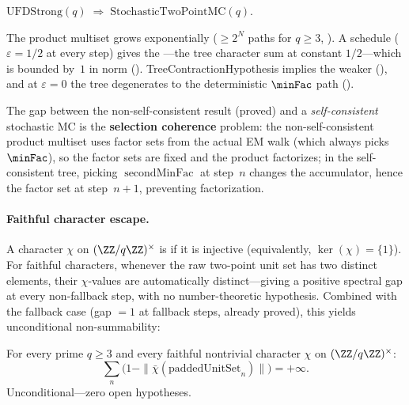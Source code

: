 \begin{theorem}
\label{thm:stochastic-two-point}
$\mathrm{UFDStrong}(q) \;\Longrightarrow\; \mathrm{StochasticTwoPointMC}(q)$.
\end{theorem}

\noindent The product multiset grows exponentially
($\geq 2^N$ paths for $q \geq 3$,
).
A  schedule ($\varepsilon = 1/2$ at every step) gives
the ---the tree character sum at constant
$1/2$---which is bounded by~$1$ in norm
().
TreeContractionHypothesis implies the weaker
(),
and at $\varepsilon = 0$ the tree degenerates to the deterministic
$\minFac$ path
().

The gap between the non-self-consistent result (proved) and a
\emph{self-consistent} stochastic MC is the \textbf{selection coherence}
problem: the non-self-consistent product multiset uses factor sets from
the actual EM walk (which always picks $\minFac$), so the factor sets
are fixed and the product factorizes; in the self-consistent tree,
picking $\operatorname{secondMinFac}$ at step~$n$ changes the
accumulator, hence the factor set at step~$n{+}1$, preventing
factorization.

\paragraph{Faithful character escape.}
A character $\chi$ on $(\ZZ/q\ZZ)^\times$ is  if it
is injective (equivalently, $\ker(\chi) = \{1\}$).  For faithful
characters, whenever the raw two-point unit set has two distinct
elements, their $\chi$-values are automatically distinct---giving a
positive spectral gap at every non-fallback step, with no
number-theoretic hypothesis.  Combined with the fallback case (gap $= 1$
at fallback steps, already proved), this yields unconditional
non-summability:

\begin{theorem}
\label{thm:faithful-escape}
For every prime $q \geq 3$ and every faithful nontrivial character
$\chi$ on $(\ZZ/q\ZZ)^\times$:
\[
  \sum_n \bigl(1 - \|\bar\chi(\text{paddedUnitSet}_n)\|\bigr)
  = +\infty.
\]
Unconditional---zero open hypotheses.
\end{theorem}

